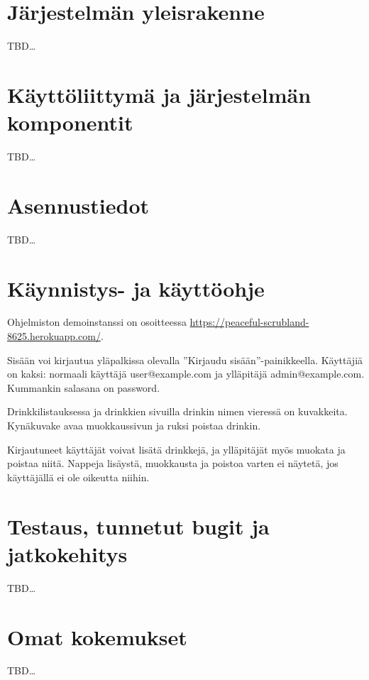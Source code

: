 \documentclass[a4paper]{article}
\begin{document}
\section{Järjestelmän yleisrakenne}
TBD\ldots{}

\section{Käyttöliittymä ja järjestelmän komponentit}
TBD\ldots{}

\section{Asennustiedot}
TBD\ldots{}

\section{Käynnistys- ja käyttöohje}
Ohjelmiston demoinstanssi on osoitteessa \url{https://peaceful-scrubland-8625.herokuapp.com/}.

Sisään voi kirjautua yläpalkissa olevalla ''Kirjaudu sisään''-painikkeella. Käyttäjiä on kaksi: normaali käyttäjä user@example.com ja ylläpitäjä admin@example.com. Kummankin salasana on password.

Drinkkilistauksessa ja drinkkien sivuilla drinkin nimen vieressä on kuvakkeita. Kynäkuvake avaa muokkaussivun ja ruksi poistaa drinkin.

Kirjautuneet käyttäjät voivat lisätä drinkkejä, ja ylläpitäjät myös muokata ja poistaa niitä. Nappeja lisäystä, muokkausta ja poistoa varten ei näytetä, jos käyttäjällä ei ole oikeutta niihin.

\section{Testaus, tunnetut bugit ja jatkokehitys}
TBD\ldots{}

\section{Omat kokemukset}
TBD\ldots{}
\end{document}
